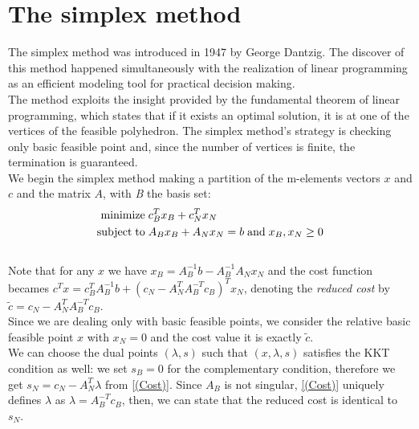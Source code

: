 \documentclass[a4paper,10 pt,titlepage,twoside]{book}
\theoremstyle{plain}
\theoremstyle{definition}
\theoremstyle{remark}
\begin{document}
\chapter{The simplex method}
The simplex method was introduced in 1947 by George Dantzig. The discover of this method happened simultaneously with the realization of linear programming as an efficient modeling tool for practical decision making.\\
The method exploits the insight provided by the fundamental theorem
of linear programming, which states that if it exists an optimal solution, it is at one of the vertices of the feasible polyhedron. The simplex method's strategy is checking only basic feasible point and, since the number of vertices is finite, the termination is guaranteed.\\
We begin the simplex method making a partition of the m-elements vectors $x$ and $c$ and the matrix $A$, with \textit{B} the basis set:
\begin{equation}
\begin{split}
\text{minimize\;} &c^{T}_{B}x_{B}+c^{T}_{N}x_{N}\\
\text{subject\;to\;}&A_{B}x_{B}+A_{N}x_{N} = b\text{\;and\;}x_{B}, x_{N}\geq0
\end{split}
\end{equation}
 \\Note that for any $x$ we have $x_{B}=A_{B}^{-1}b-A_{B}^{-1}A_{N}x_{N}$ and the cost function becames $c^{T}x=c_{B}^{T}A_{B}^{-1}b+(c_{N}-A_{N}^{T}A_{B}^{-T}c_{B})^{T}x_{N}$, denoting the \textit{reduced cost} by $\widetilde{c}=c_{N}-A_{N}^{T}A_{B}^{-T}c_{B}$.\\ Since we are dealing only with basic feasible points, we consider the relative basic feasible point $x$ with $x_{N}= 0$ and the cost value it is exactly $\widetilde{c}$.\\
 We can choose the dual points $(\lambda,s)$ such that $(x, \lambda, s)$ satisfies the KKT condition as well: we set $s_{B}= 0$ for the complementary condition, therefore we get $s_{N}= c_{N}- A_{N}^{T}\lambda$ from \ref{(Cost)}. Since $A_{B}$ is not singular, \ref{(Cost)} uniquely defines $\lambda$ as $\lambda = A_{B}^{-T}c_{B}$, then, we can state that the reduced cost is identical to $s_{N}$.\\  
 
\end{document}
